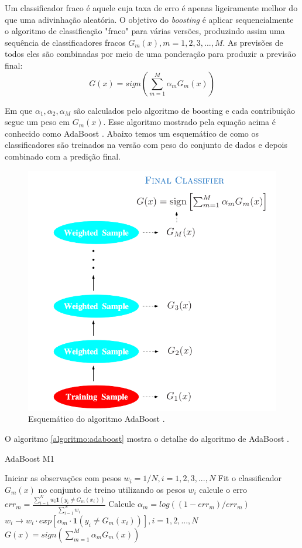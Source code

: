 Um classificador fraco é aquele cuja taxa de erro é apenas ligeiramente melhor do que uma adivinhação aleatória. O objetivo do \textit{boosting} é aplicar sequencialmente o
algoritmo de classificação "fraco" para várias versões, produzindo assim uma sequência de classificadores fracos $G_m(x),m= 1, 2, 3, ..., M$.
As previsões de todos eles são combinadas por meio de uma ponderação para produzir a previsão final:
\begin{equation}
    G(x) = sign(\sum_{m=1}^M\alpha_mG_m(x))
\end{equation}

Em que $\alpha_1,\alpha_2, \alpha_M$ são calculados pelo algoritmo de boosting e cada contribuição segue um peso em $G_m(x)$. Esse algoritmo mostrado pela equação acima é conhecido como AdaBoost \cite{adaboost}. Abaixo temos um esquemático de como os classificadores são treinados na versão com peso do conjunto de dados e depois combinado com a predição final.
\begin{figure}[h]
 \caption{Esquemático do algoritmo AdaBoost \cite{hastie}.}
 \label{fig:ex:adaboost}
 \centering
 \includegraphics[scale=0.3]{images/adaboost.png}
\end{figure}

O algoritmo \ref{algoritmo:adaboost} mostra o detalhe do algoritmo de AdaBoost \cite{adaboost,hastie}.
\begin{algorithm}[H]
\caption{AdaBoost M1}\label{algoritmo:adaboost}
\begin{algorithmic}[1]
\State Iniciar as observações com pesos $w_i = 1/N, i=1,2,3,...,N$
\State {}
\State Fit o classificador $G_m(x)$ no conjunto de treino utilizando os pesos $w_i$
\State calcule o erro $err_m = \frac{\sum_{i=1}^Nw_i\mathbf{1}(y_i\neq G_m(x_i))}{\sum_{i=1}^Nw_i}$
\State Calcule $\alpha_m = log((1-err_m)/err_m)$
\State $w_i \rightarrow w_i\cdot exp[\alpha_m \cdot \mathbf{1}(y_i\neq G_m(x_i))],i=1,2,...,N$
\EndFor
\State \Return $G(x) = sign(\sum_{m=1}^M\alpha_mG_m(x))$
\end{algorithmic}
\end{algorithm}

